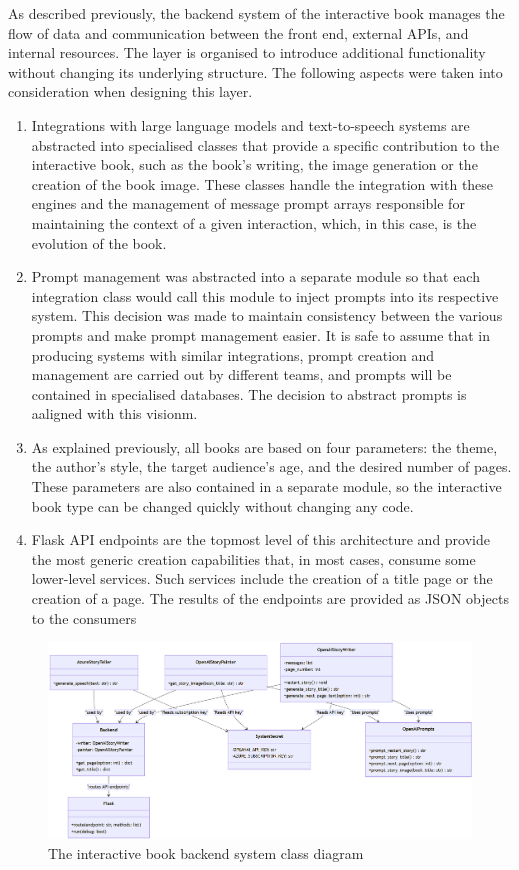 \documentclass[conference]{IEEEtran}
\begin{document}
	As described previously, the backend system of the interactive book manages the flow of data and communication between the front end, external APIs, and internal resources. The layer is organised to introduce additional functionality without changing its underlying structure. The following aspects were taken into consideration when designing this layer.
		
	\begin{enumerate}
		\item Integrations with large language models and text-to-speech systems are abstracted into specialised classes that provide a specific contribution to the interactive book, such as the book's writing, the image generation or the creation of the book image. These classes handle the integration with these engines and the management of message prompt arrays responsible for maintaining the context of a given interaction, which, in this case, is the evolution of the book.
		\item Prompt management was abstracted into a separate module so that each integration class would call this module to inject prompts into its respective system. This decision was made to maintain consistency between the various prompts and make prompt management easier. It is safe to assume that in producing systems with similar integrations, prompt creation and management are carried out by different teams, and prompts will be contained in specialised databases. The decision to abstract prompts is aaligned with this visionm.
		\item As explained previously, all books are based on four parameters: the theme, the author's style, the target audience's age, and the desired number of pages. These parameters are also contained in a separate module, so the interactive book type can be changed quickly without changing any code.
		\item Flask API endpoints are the topmost level of this architecture and provide the most generic creation capabilities that, in most cases, consume some lower-level services. Such services include the creation of a title page or the creation of a page. The results of the endpoints are provided as JSON objects to the consumers
	\end{enumerate}
	
	\begin{figure}[H]
		\centering
		\includegraphics[width=0.9\linewidth]{img/img-ARI3333-backend-class-diagram}
		\caption{The interactive book backend system class diagram}
		\label{fig:img-ari3333-backend-class-diagram}
	\end{figure}
	
\end{document}
